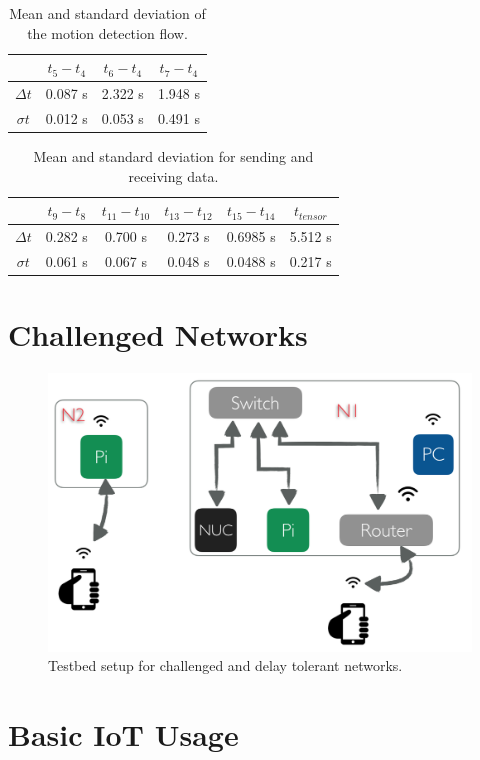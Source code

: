\begin{table}[!ht]
\centering
\begin{tabular}{*{4}{c}}\toprule
&$t_5 - t_4$  & $t_6 - t_4$  & $t_7-t_4$ \\ \midrule
$\Delta t$ &0.087 s&2.322 s&1.948 s\\
$\sigma t$&0.012 s&0.053 s&0.491 s\\
\end{tabular}
\caption{Mean and standard deviation of the motion detection flow.}
\label{table:motion}
\end{table}

\begin{table}[!ht]
\centering
\begin{tabular}{ c | c | c| c | c| c }	\toprule
&$t_9 - t_8$  & $t_{11} - t_{10}$  & $t_{13}-t_{12}$ & $t_{15}-t_{14}$&  $t_{tensor}$ \\ \midrule
$\Delta t$&0.282 s&0.700 s&	0.273 s&0.6985 s&5.512 s\\
$\sigma t$&0.061 s&0.067 s&	0.048 s&0.0488 s&0.217 s\\
	\end{tabular}
	\caption{Mean and standard deviation for sending and receiving data.}
	\label{table:data}
\end{table}


\section{Challenged Networks}
\begin{figure}[H]
	\centering
	\includegraphics[scale=0.6]{images/tb-dtn.png}
	\caption{Testbed setup for challenged and delay tolerant networks.}
	\label{fig:tb-dtn}
\end{figure} 

\section{Basic IoT Usage}


